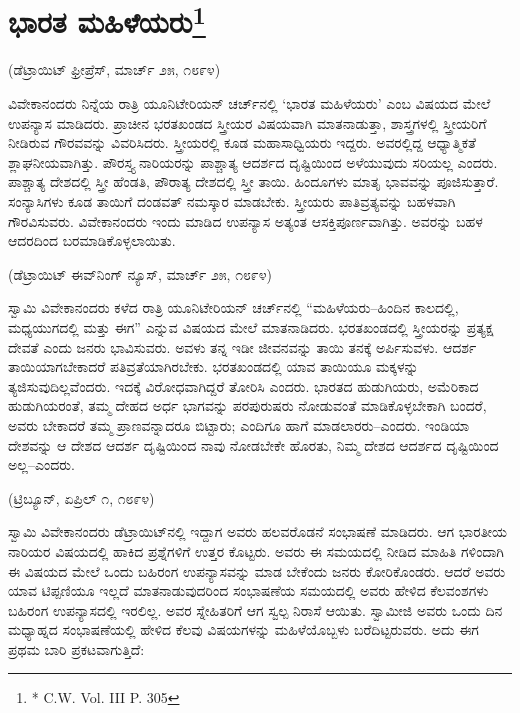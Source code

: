 \delimiter


\section[ಭಾರತ ಮಹಿಳೆಯರು]{ಭಾರತ ಮಹಿಳೆಯರು\protect\footnote{* C.W. Vol. III P. 305}}

\begin{center}
(ಡೆಟ್ರಾಯಿಟ್​ ಫ್ರೀಪ್ರೆಸ್​, ಮಾರ್ಚ್​ ೨೫, ೧೮೯೪)
\end{center}

ವಿವೇಕಾನಂದರು ನಿನ್ನೆಯ ರಾತ್ರಿ ಯೂನಿಟೇರಿಯನ್​ ಚರ್ಚ್​ನಲ್ಲಿ ‘ಭಾರತ ಮಹಿಳೆಯರು’ ಎಂಬ ವಿಷಯದ ಮೇಲೆ ಉಪನ್ಯಾಸ ಮಾಡಿದರು. ಪ್ರಾಚೀನ ಭರತಖಂಡದ ಸ್ತ್ರೀಯರ ವಿಷಯವಾಗಿ ಮಾತನಾಡುತ್ತಾ, ಶಾಸ್ತ್ರಗಳಲ್ಲಿ ಸ್ತ್ರೀಯರಿಗೆ ನೀಡಿರುವ ಗೌರವವನ್ನು ವಿವರಿಸಿದರು. ಸ್ತ್ರೀಯರಲ್ಲಿ ಕೂಡ ಮಹಾಸಾಧ್ವಿಯರು ಇದ್ದರು. ಅವರಲ್ಲಿದ್ದ ಆಧ್ಯಾತ್ಮಿಕತೆ ಶ್ಲಾಘನೀಯವಾಗಿತ್ತು. ಪೌರಸ್ತ್ಯ ನಾರಿಯರನ್ನು ಪಾಶ್ಚಾತ್ಯ ಆದರ್ಶದ ದೃಷ್ಟಿಯಿಂದ ಅಳೆಯುವುದು ಸರಿಯಲ್ಲ ಎಂದರು. ಪಾಶ್ಚಾತ್ಯ ದೇಶದಲ್ಲಿ ಸ್ತ್ರೀ ಹೆಂಡತಿ, ಪೌರಾತ್ಯ ದೇಶದಲ್ಲಿ ಸ್ತ್ರೀ ತಾಯಿ. ಹಿಂದೂಗಳು ಮಾತೃ ಭಾವವನ್ನು ಪೂಜಿಸುತ್ತಾರೆ. ಸಂನ್ಯಾಸಿಗಳು ಕೂಡ ತಾಯಿಗೆ ದಂಡವತ್​ ನಮಸ್ಕಾರ ಮಾಡಬೇಕು. ಸ್ತ್ರೀಯರು ಪಾತಿವ್ರತ್ಯವನ್ನು ಬಹಳವಾಗಿ ಗೌರವಿಸುವರು. ವಿವೇಕಾನಂದರು ಇಂದು ಮಾಡಿದ ಉಪನ್ಯಾಸ ಅತ್ಯಂತ ಆಸಕ್ತಿಪೂರ್ಣವಾಗಿತ್ತು. ಅವರನ್ನು ಬಹಳ ಆದರದಿಂದ ಬರಮಾಡಿಕೊಳ್ಳಲಾಯಿತು.

\delimiter

\begin{center}
(ಡೆಟ್ರಾಯಿಟ್​ ಈವ್​ನಿಂಗ್​ ನ್ಯೂಸ್​, ಮಾರ್ಚ್​ ೨೫, ೧೮೯೪)
\end{center}

ಸ್ವಾಮಿ ವಿವೇಕಾನಂದರು ಕಳೆದ ರಾತ್ರಿ ಯೂನಿಟೇರಿಯನ್​ ಚರ್ಚ್​ನಲ್ಲಿ “ಮಹಿಳೆಯರು–ಹಿಂದಿನ ಕಾಲದಲ್ಲಿ, ಮಧ್ಯಯುಗದಲ್ಲಿ ಮತ್ತು ಈಗ” ಎನ್ನುವ ವಿಷಯದ ಮೇಲೆ ಮಾತನಾಡಿದರು. ಭರತಖಂಡದಲ್ಲಿ ಸ್ತ್ರೀಯರನ್ನು ಪ್ರತ್ಯಕ್ಷ ದೇವತೆ ಎಂದು ಜನರು ಭಾವಿಸುವರು. ಅವಳು ತನ್ನ ಇಡೀ ಜೀವನವನ್ನು ತಾಯಿ ತನಕ್ಕೆ ಅರ್ಪಿಸುವಳು. ಆದರ್ಶ ತಾಯಿಯಾಗಬೇಕಾದರೆ ಪತಿವ್ರತೆಯಾಗಿರಬೇಕು. ಭರತಖಂಡದಲ್ಲಿ ಯಾವ ತಾಯಿಯೂ ಮಕ್ಕಳನ್ನು ತ್ಯಜಿಸುವುದಿಲ್ಲವೆಂದರು. ಇದಕ್ಕೆ ವಿರೋಧವಾಗಿದ್ದರೆ ತೋರಿಸಿ ಎಂದರು. ಭಾರತದ ಹುಡುಗಿಯರು, ಅಮೆರಿಕಾದ ಹುಡುಗಿಯರಂತೆ, ತಮ್ಮ ದೇಹದ ಅರ್ಧ ಭಾಗವನ್ನು ಪರಪುರುಷರು ನೋಡುವಂತೆ ಮಾಡಿಕೊಳ್ಳಬೇಕಾಗಿ ಬಂದರೆ, ಅವರು ಬೇಕಾದರೆ ತಮ್ಮ ಪ್ರಾಣವನ್ನಾದರೂ ಬಿಟ್ಟಾರು; ಎಂದಿಗೂ ಹಾಗೆ ಮಾಡಲಾರರು–ಎಂದರು. ಇಂಡಿಯಾ ದೇಶವನ್ನು ಆ ದೇಶದ ಆದರ್ಶ ದೃಷ್ಟಿಯಿಂದ ನಾವು ನೋಡಬೇಕೇ ಹೊರತು, ನಿಮ್ಮ ದೇಶದ ಆದರ್ಶದ ದೃಷ್ಟಿಯಿಂದ ಅಲ್ಲ–ಎಂದರು.

\delimiter

\begin{center}
(ಟ್ರಿಬ್ಯೂನ್​, ಏಪ್ರಿಲ್​ ೧, ೧೮೯೪)
\end{center}

ಸ್ವಾಮಿ ವಿವೇಕಾನಂದರು ಡೆಟ್ರಾಯಿಟ್​ನಲ್ಲಿ ಇದ್ದಾಗ ಅವರು ಹಲವರೊಡನೆ ಸಂಭಾಷಣೆ ಮಾಡಿದರು. ಆಗ ಭಾರತೀಯ ನಾರಿಯರ ವಿಷಯದಲ್ಲಿ ಹಾಕಿದ ಪ್ರಶ್ನೆಗಳಿಗೆ ಉತ್ತರ ಕೊಟ್ಟರು. ಅವರು ಈ ಸಮಯದಲ್ಲಿ ನೀಡಿದ ಮಾಹಿತಿ ಗಳಿಂದಾಗಿ ಈ ವಿಷಯದ ಮೇಲೆ ಒಂದು ಬಹಿರಂಗ ಉಪನ್ಯಾಸವನ್ನು ಮಾಡ ಬೇಕೆಂದು ಜನರು ಕೋರಿಕೊಂಡರು. ಆದರೆ ಅವರು ಯಾವ ಟಿಪ್ಪಣಿಯೂ ಇಲ್ಲದೆ ಮಾತನಾಡುವುದರಿಂದ ಸಂಭಾಷಣೆಯ ಸಮಯದಲ್ಲಿ ಅವರು ಹೇಳಿದ ಕೆಲವಂಶಗಳು ಬಹಿರಂಗ ಉಪನ್ಯಾಸದಲ್ಲಿ ಇರಲಿಲ್ಲ. ಅವರ ಸ್ನೇಹಿತರಿಗೆ ಆಗ ಸ್ವಲ್ಪ ನಿರಾಸೆ ಆಯಿತು. ಸ್ವಾಮೀಜಿ ಅವರು ಒಂದು ದಿನ ಮಧ್ಯಾಹ್ನದ ಸಂಭಾಷಣೆಯಲ್ಲಿ ಹೇಳಿದ ಕೆಲವು ವಿಷಯಗಳನ್ನು ಮಹಿಳೆಯೊಬ್ಬಳು ಬರೆದಿಟ್ಟರುವರು. ಅದು ಈಗ ಪ್ರಥಮ ಬಾರಿ ಪ್ರಕಟವಾಗುತ್ತಿದೆ:

